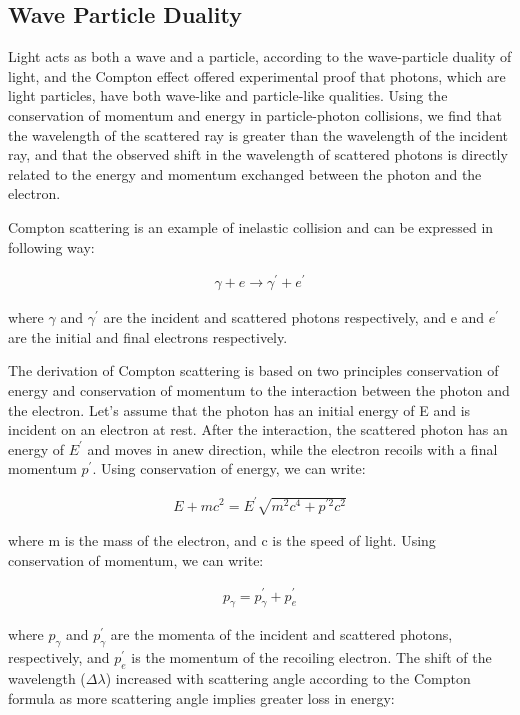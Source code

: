 \subsection{Wave Particle Duality}

Light acts as both a wave and a particle, according to the wave-particle duality of light, and the Compton effect offered experimental proof that photons, which are light particles, have both wave-like and particle-like qualities. Using the conservation of momentum and energy in particle-photon collisions, we find that the wavelength of the scattered ray is greater than the wavelength of the incident ray, and that the observed shift in the wavelength of scattered photons is directly related to the energy and momentum exchanged between the photon and the electron.

Compton scattering is an example of inelastic collision and can be expressed in following way:

\begin{align*}\gamma + e \rightarrow \gamma^{'} + e^{'}\end{align*}

where $\gamma$ and $\gamma^{'}$  are the incident and scattered photons respectively, and e and $e^{'}$ are the initial and final electrons respectively.


The derivation of Compton scattering is based on two principles conservation of energy and conservation of momentum to the interaction between the photon and the electron. Let's assume that the photon has an initial energy of E and is incident on an electron at rest. After the interaction, the scattered photon has an energy of $E^{'}$ and moves in anew direction, while the electron recoils with a final momentum $p^{'}$. Using conservation of energy, we can write:

\begin{align}E + mc^2 = E^{'} \sqrt{m^2c^4+p^{'2}c^2}\end{align}

where m is the mass of the electron, and c is the speed of light. Using conservation of momentum, we can write:

\begin{align}p_{\gamma} = p^{'}_{\gamma} + p^{'}_{e}\end{align}

where $p_{\gamma}$ and $p^{'}_{\gamma}$ are the momenta of the incident and scattered photons, respectively, and $p^{'}_{e}$ is the momentum of the recoiling electron. The shift of the wavelength ($\Delta\lambda$) increased with scattering angle according to the Compton formula as more scattering angle implies greater loss in energy:


